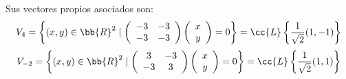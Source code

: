 \begin{ejercicio}
\begin{enumerate}
        Sus vectores propios asociados son:
        \begin{equation*}
            V_{4} = \left\{(x,y)\in \bb{R}^2 \mid \left(\begin{array}{cc}
                -3 & -3 \\
                -3 & -3
            \end{array}\right)\left(\begin{array}{c}
                x\\y
            \end{array}\right)=0 \right\} = \cc{L}\left\{\frac{1}{\sqrt{2}}(1,-1)\right\}
        \end{equation*}
        \begin{equation*}
            V_{-2} = \left\{(x,y)\in \bb{R}^2 \mid \left(\begin{array}{cc}
                3 & -3 \\
                -3 & 3
            \end{array}\right)\left(\begin{array}{c}
                x\\y
            \end{array}\right)=0 \right\} = \cc{L}\left\{\frac{1}{\sqrt{2}}(1,1)\right\}
        \end{equation*}
    

\end{enumerate}
\end{ejercicio}
